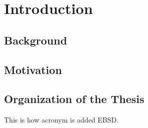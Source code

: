 
\chapter{Introduction} %

\label{Chapter1}



\section{Background}
\lipsum[2-4]
\section{Motivation}

\lipsum[2-4]

\section{Organization of the Thesis}

This is how acronym is added \ac{EBSD}.

\lipsum[2-4]